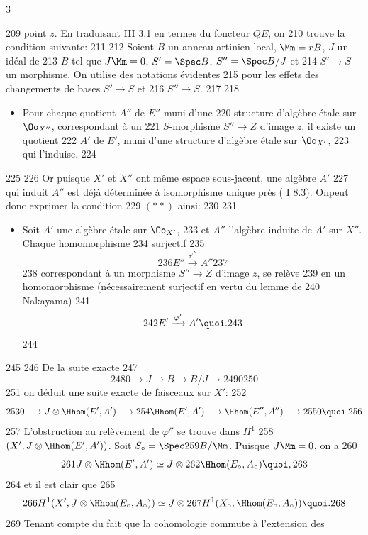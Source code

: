 3	\documentclass[10pt]{../fichiers-configuration-latex/smfart}
\begin{document}
   209	point $z$. En traduisant  III 3.1 en termes du foncteur $QE$, on
   210	trouve la condition suivante:
   211	
   212	Soient $B$ un anneau artinien local, $\Mm=rB$, $J$ un idéal de
   213	$B$ tel que $J\Mm=0$, $S'=\Spec B$, $S''=\Spec B/J$ et
   214	$S'\rightarrow S$ un morphisme. On utilise des notations évidentes
   215	pour les effets des changements de bases $S'\rightarrow S$ et
   216	$S''\rightarrow S$.
   217	
   218	\begin{itemize}
   219	\item[$(\ast)$] Pour chaque quotient $A''$ de $E''$ muni d'une
   220	structure d'algèbre étale sur $\Oo_{X''}$, correspondant à un
   221	$S$-morphisme $S''\rightarrow Z$ d'image $z$, il existe un quotient
   222	$A'$ de $E'$, muni d'une structure d'algèbre étale sur $\Oo_{X'}$,
   223	qui l'induise.
   224	\end{itemize}
   225	
   226	Or puisque $X'$ et $X''$ ont même espace sous-jacent, une algèbre $A'$
   227	qui induit $A''$ est déjà déterminée à isomorphisme unique près (	I 8.3). On\pageoriginale peut donc exprimer la condition
   229	$({\ast}{\ast})$ ainsi:
   230	
   231	\begin{itemize}
   232	\item[$({\ast}{\ast})$] Soit $A'$ une algèbre étale sur $\Oo_{X'}$,
   233	et $A''$ l'algèbre induite de $A'$ sur $X''$. Chaque homomorphisme
   234	surjectif
   235	$$
   236	E''\xrightarrow{\varphi''}A''
   237	$$
   238	correspondant à un morphisme $S''\rightarrow Z$ d'image $z$, se relève
   239	en un homomorphisme (nécessairement surjectif en vertu du lemme de
   240	Nakayama)
   241	$$
   242	E'\xrightarrow{\varphi'}A'{\quoi}.
   243	$$
   244	\end{itemize}
   245	
   246	De la suite exacte
   247	$$
   248	0\longrightarrow J\longrightarrow B\longrightarrow B/J\longrightarrow
   249	0
   250	$$
   251	on déduit une suite exacte de faisceaux sur $X'$:
   252	$$
   253	0\longrightarrow J\otimes \Hhom(E',A')\longrightarrow
   254	\Hhom(E',A')\longrightarrow \Hhom(E'', A'')\longrightarrow
   255	0{\quoi}.
   256	$$
   257	L'obstruction au relèvement de $\varphi''$ se trouve dans $H^1$
   258	$(X',J\otimes \Hhom(E',A'))$. Soit $S_{\circ}=\Spec
   259	B/\Mm$. Puisque $J\Mm=0$, on a
   260	$$
   261	J\otimes \Hhom(E',A')\simeq J\otimes
   262	\Hhom(E_{\circ},A_{\circ}){\quoi},
   263	$$
   264	et il est clair que
   265	$$
   266	H^1(X',J\otimes \Hhom(E_{\circ},A_{\circ}))\simeq J\otimes
   267	H^1(X_{\circ},\Hhom(E_{\circ},A_{\circ})){\quoi}.
   268	$$
   269	Tenant compte du fait que la cohomologie commute à l'extension des
\end{document}
